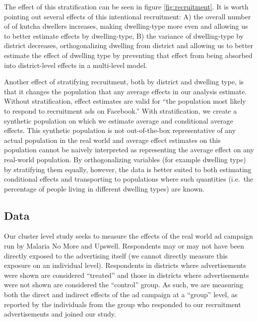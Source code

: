 \documentclass[a4paper,12pt]{article}
\begin{document}
The effect of this stratification can be seen in figure \ref{fig:recruitment}. It is worth pointing out several effects of this intentional recruitment: A) the overall number of of kutcha dwellers increases, making dwelling-type more even and allowing us to better estimate effects by dwelling-type, B) the variance of dwelling-type by district decreases, orthogonalizing dwelling from district and allowing us to better estimate the effect of dwelling type by preventing that effect from being absorbed into district-level effects in a multi-level model.

Another effect of stratifying recruitment, both by district and dwelling type, is that it changes the population that any average effects in our analysis estimate. Without stratification, effect estimates are valid for ``the population most likely to respond to recruitment ads on Facebook.'' With stratification, we create a synthetic population on which we estimate average and conditional average effects. This synthetic population is not out-of-the-box representative of any actual population in the real world and average effect estimates on this population cannot be naively interpreted as representing the average effect on any real-world population. By orthogonalizing variables (for example dwelling type) by stratifying them equally, however, the data is better suited to both estimating conditional effects and transporting to populations where such quantities (i.e.\ the percentage of people living in different dwelling types) are known.








\subsection{Data}

Our cluster level study seeks to measure the effects of the real world ad campaign run by Malaria No More and Upswell. Respondents may or may not have been directly exposed to the advertising itself (we cannot directly measure this exposure on an individual level). Respondents in districts where advertisements were shown are considered ``treated'' and those in districts where advertisements were not shown are considered the ``control'' group. As such, we are measuring both the direct and indirect effects of the ad campaign at a ``group'' level, as reported by the individuals from the group who responded to our recruitment advertisements and joined our study.
\end{document}
